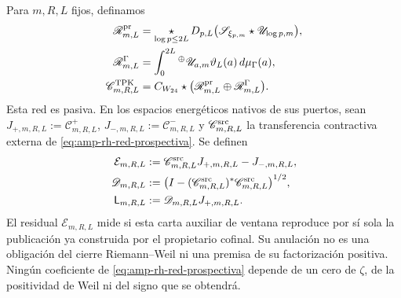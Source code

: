 \begin{theorem}
\label{thm:amp-rh-acoplamiento-prospectivo}
Para \(m,R,L\) fijos, definamos
\begin{align}
 \mathscr R^{\rm pr}_{m,L}
 &=
 \mathop{\star}_{\log p\leq2L}
 D_{p,L}\bigl(\mathscr S_{\xi_{p,m}}\star
              \mathscr U_{\log p,m}\bigr),\nonumber\\
 \mathscr R^\Gamma_{m,L}
 &=
 \int_0^{2L}{}^\oplus
 \mathscr U_{a,m}
 \vartheta_L(a)\,d\mu_\Gamma(a),\nonumber\\
 \mathscr C^{\rm TPK}_{m,R,L}
 &=C_{W_{24}}\star
 \bigl(\mathscr R^{\rm pr}_{m,L}
       \oplus\mathscr R^\Gamma_{m,L}\bigr).
 \label{eq:amp-rh-red-prospectiva}
\end{align}
Esta red es pasiva. En los espacios energéticos nativos de sus puertos,
sean
\(J_{+,m,R,L}:=\mathcal C^+_{m,R,L}\),
\(J_{-,m,R,L}:=\mathcal C^-_{m,R,L}\) y
\(\mathscr C^{\rm src}_{m,R,L}\) la transferencia contractiva externa de
\eqref{eq:amp-rh-red-prospectiva}. Se definen
\begin{equation}\label{eq:amp-rh-publicaciones-construidas}
 \begin{aligned}
 \mathcal E_{m,R,L}
 &:=\mathscr C^{\rm src}_{m,R,L}J_{+,m,R,L}
    -J_{-,m,R,L},\\
 \mathscr D_{m,R,L}
 &:=\bigl(I-(\mathscr C^{\rm src}_{m,R,L})^*
                  \mathscr C^{\rm src}_{m,R,L}\bigr)^{1/2},\\
 \mathsf L_{m,R,L}&:=\mathscr D_{m,R,L}J_{+,m,R,L}.
 \end{aligned}
\end{equation}
El residual \(\mathcal E_{m,R,L}\) mide si esta carta auxiliar de ventana
reproduce por sí sola la publicación ya construida por el propietario
cofinal. Su anulación no es una obligación del cierre Riemann--Weil ni una
premisa de su factorización positiva. Ningún coeficiente de
\eqref{eq:amp-rh-red-prospectiva} depende de un cero de \(\zeta\), de la
positividad de Weil ni del signo que se obtendrá.
\end{theorem}

